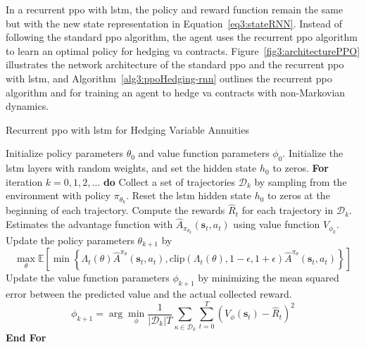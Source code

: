 In a recurrent \gls{ppo} with \gls{lstm}, the policy and reward function remain the same but with the new state representation in Equation~\eqref{eq3:stateRNN}.
Instead of following the standard \gls{ppo} algorithm, the agent uses the recurrent \gls{ppo} algorithm to learn an optimal policy for hedging \gls{va} contracts.
Figure~\ref{fig3:architecturePPO} illustrates the network architecture of the standard \gls{ppo} and the recurrent \gls{ppo} with \gls{lstm}, and Algorithm~\ref{alg3:ppoHedging-rnn} outlines the recurrent \gls{ppo} algorithm and for training an agent to hedge \gls{va} contracts with non-Markovian dynamics.

\begin{algorithm}
    \caption{Recurrent \gls{ppo} with \gls{lstm} for Hedging Variable Annuities} 
    \begin{algorithmic}[1] \label{alg3:ppoHedging-rnn}
        \STATE  Initialize policy parameters $\theta_0$ and value function parameters $\phi_0$.
        \STATE  Initialize the \gls{lstm} layers with random weights, and set the hidden state $h_0$ to zeros.
        \STATE  \textbf{For} {iteration $k=0, 1,2,\ldots$} \textbf{do}
        \STATE  \quad Collect a set of trajectories $\mathcal{D}_k$ by sampling from the environment with policy $\pi_{\theta_{k}}$.
        \STATE  \quad Reset the \gls{lstm} hidden state $h_0$ to zeros at the beginning of each trajectory.
        \STATE  \quad Compute the rewards $\hat{R}_t$ for each trajectory in $\mathcal{D}_k$.
        \STATE  \quad Estimates the advantage function with $\hat{A}_{\pi_{\theta_k}}(\mathbf{s}_t, a_t)$ using value function $V_{\phi_k}$.
        \STATE  \quad Update the policy parameters $\theta_{k+1}$ by 
        \begin{equation*}
            \max_{\theta} \mathbb{E}\left[ \min \left\{ \Lambda_t(\theta)\hat{A}^{\pi_{\theta}}(\mathbf{s}_t, a_t), \text{clip}(\Lambda_t(\theta), 1-\epsilon, 1 + \epsilon) \hat{A}^{\pi_{\theta}}(\mathbf{s}_t, a_t)  \right\} \right]
        \end{equation*}
        \STATE  \quad Update the value function parameters $\phi_{k+1}$ by minimizing the mean squared error between the predicted value and the actual collected reward.
        \begin{equation*}
            \phi_{k+1} = \arg \min_{\phi} \frac{1}{|\mathcal{D}_k|T} \sum_{\mathcal{\kappa} \in \mathcal{D}_k} \sum_{t=0}^{T} \left( V_{\phi}(\mathbf{s}_t) - \hat{R}_t \right)^2
        \end{equation*}
        \STATE  \textbf{End For}
    \end{algorithmic}
\end{algorithm}

